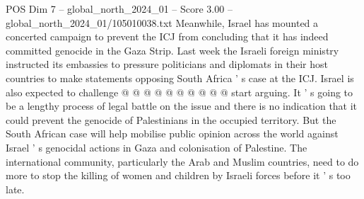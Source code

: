 \begin{textsample}{POS Dim 7 – global\_north\_2024\_01 – Score 3.00 – global\_north\_2024\_01/105010038.txt}
Meanwhile, Israel has mounted a concerted campaign to prevent the ICJ from concluding that it has indeed committed genocide in the Gaza Strip.
Last week the Israeli foreign ministry instructed its embassies to pressure politicians and diplomats in their host countries to make statements opposing South Africa ' s case at the ICJ.
Israel is also expected to challenge @ @ @ @ @ @ @ @ @ @ start arguing.
It ' s going to be a lengthy process of legal battle on the issue and there is no indication that it could prevent the genocide of Palestinians in the occupied territory.
But the South African case will help mobilise public opinion across the world against Israel ' s genocidal actions in Gaza and colonisation of Palestine.
The international community, particularly the Arab and Muslim countries, need to do more to stop the killing of women and children by Israeli forces before it ' s too late.

\end{textsample}
